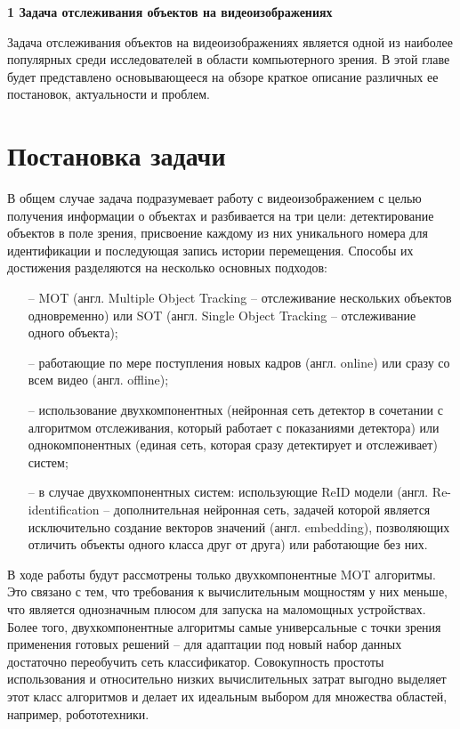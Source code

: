 \newpage
\begin{flushleft}
  \textbf{\large 1 Задача отслеживания объектов на видеоизображениях}
\end{flushleft}

Задача отслеживания объектов на видеоизображениях является одной из наиболее популярных среди исследователей в области компьютерного зрения. 
В этой главе будет представлено основывающееся на обзоре \cite{du2024exploring} краткое описание различных ее постановок, актуальности и проблем. 


\section{Постановка задачи}
В общем случае задача подразумевает работу с видеоизображением с целью получения информации о объектах и разбивается на три цели:
детектирование объектов в поле зрения, присвоение каждому из них уникального номера для идентификации и последующая запись истории перемещения. Способы их достижения разделяются на несколько основных подходов:
\begin{itemize}
    \item[--] MOT (англ. Multiple Object Tracking -- отслеживание нескольких объектов одновременно) или SOT (англ. Single Object Tracking -- отслеживание одного объекта);
    \item[--] работающие по мере поступления новых кадров (англ. online) или сразу со всем видео (англ. offline);
    \item[--] использование двухкомпонентных (нейронная сеть детектор в сочетании с алгоритмом отслеживания, который работает с показаниями детектора) или однокомпонентных (единая сеть, которая сразу детектирует и отслеживает) систем;
    \item[--] в случае двухкомпонентных систем: использующие ReID модели (англ. Re-identification -- дополнительная нейронная сеть, задачей которой является исключительно создание векторов значений (англ. embedding), позволяющих отличить объекты одного класса друг от друга) или работающие без них.
\end{itemize}

В ходе работы будут рассмотрены только двухкомпонентные MOT алгоритмы. Это связано с тем, что требования к вычислительным мощностям у них меньше, что является однозначным плюсом для запуска на маломощных устройствах.
Более того, двухкомпонентные алгоритмы самые универсальные с точки зрения применения готовых решений -- для адаптации под новый набор данных достаточно переобучить сеть классификатор.
Совокупность простоты использования и относительно низких вычислительных затрат выгодно выделяет этот класс алгоритмов и делает их идеальным выбором для множества областей, например, робототехники.

